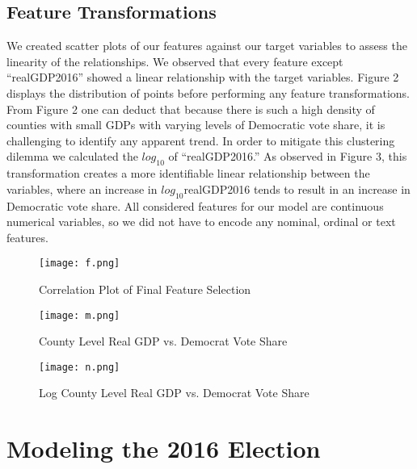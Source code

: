 \documentclass[letterpaper, twocolumn]{article}
\begin{document}
\subsection{Feature Transformations}

We created scatter plots of our features against our target variables to assess the linearity of the relationships. We observed that every feature except “realGDP2016” showed a linear relationship with the target variables. Figure 2 displays the distribution of points before performing any feature transformations. From Figure 2 one can deduct that because there is such a high density of counties with small GDPs with varying levels of Democratic vote share, it is challenging to identify any apparent trend. In order to mitigate this clustering dilemma we calculated the $log_{10}$ of “realGDP2016.” As observed in Figure 3, this transformation creates a more identifiable linear relationship between the variables, where an increase in $log_{10}$realGDP2016 tends to result in an increase in Democratic vote share. All considered features for our model are continuous numerical variables, so we did not have to encode any nominal, ordinal or text features.

\begin{figure}[h]
    \centering
    \texttt{[image: f.png]}
    \caption{Correlation Plot of Final Feature Selection}
    \label{fig:arstmade}
\end{figure}

\begin{figure}[h]
    \centering
    \texttt{[image: m.png]}
    \caption{County Level Real GDP vs. Democrat Vote Share}
    \label{fig:arstmade}
\end{figure}

\begin{figure}[h]
    \centering
    \texttt{[image: n.png]}
    \caption{Log County Level Real GDP vs. Democrat Vote Share}
    \label{fig:arstmade}
\end{figure}

\section{Modeling the 2016 Election}
\end{document}
